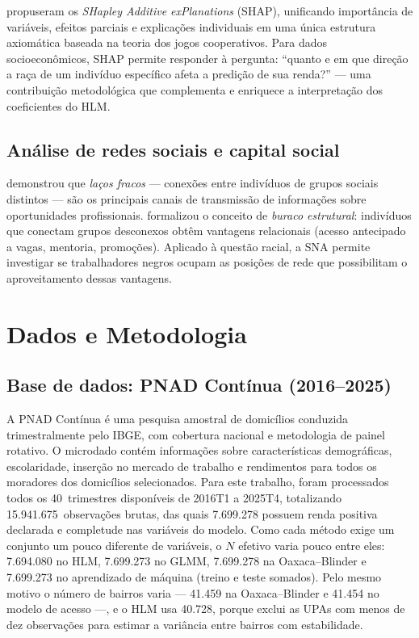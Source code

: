 \documentclass[12pt, a4paper, oneside]{article}
\begin{document}
 propuseram os \textit{SHapley Additive exPlanations}
(SHAP), unificando importância de variáveis, efeitos parciais e explicações
individuais em uma única estrutura axiomática baseada na teoria dos jogos
cooperativos. Para dados socioeconômicos, SHAP permite responder à pergunta:
``quanto e em que direção a raça de um indivíduo específico afeta a predição
de sua renda?'' --- uma contribuição metodológica que complementa e enriquece
a interpretação dos coeficientes do HLM.

\subsection{Análise de redes sociais e capital social}

 demonstrou que \textit{laços fracos} ---
conexões entre indivíduos de grupos sociais distintos --- são os principais
canais de transmissão de informações sobre oportunidades profissionais.
 formalizou o conceito de \textit{buraco estrutural}:
indivíduos que conectam grupos desconexos obtêm vantagens relacionais
(acesso antecipado a vagas, mentoria, promoções). Aplicado à questão racial,
a SNA permite investigar se trabalhadores negros ocupam as posições de rede
que possibilitam o aproveitamento dessas vantagens.

\section{Dados e Metodologia}
\label{sec:metodologia}

\subsection{Base de dados: PNAD Contínua (2016--2025)}

A PNAD Contínua é uma pesquisa amostral de domicílios conduzida
trimestralmente pelo IBGE, com cobertura nacional e metodologia de painel
rotativo. O microdado contém informações sobre características demográficas,
escolaridade, inserção no mercado de trabalho e rendimentos para todos os
moradores dos domicílios selecionados. Para este trabalho, foram processados
todos os 40~trimestres disponíveis de 2016T1 a 2025T4, totalizando
15.941.675~observações brutas, das quais 7.699.278 possuem renda positiva
declarada e completude nas variáveis do modelo. Como cada método exige um conjunto um pouco
diferente de variáveis, o $N$ efetivo varia pouco entre eles: 7.694.080 no HLM,
7.699.273 no GLMM, 7.699.278 na Oaxaca--Blinder e 7.699.273 no aprendizado de máquina
(treino e teste somados). Pelo mesmo motivo o número de bairros varia ---
41.459 na Oaxaca--Blinder e 41.454 no modelo de acesso ---, e o HLM
usa 40.728, porque exclui as UPAs com menos de dez observações para estimar a
variância entre bairros com estabilidade.
\end{document}
